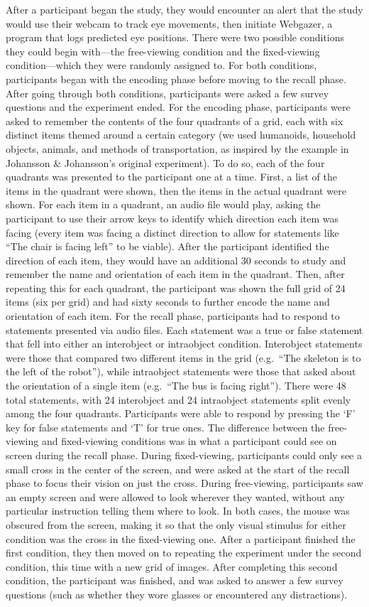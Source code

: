 \documentclass[
  english,
  man]{apa6}
\begin{document}
After a participant began the study, they would encounter an alert that the study would use their webcam to track eye movements, then initiate Webgazer, a program that logs predicted eye positions. There were two possible conditions they could begin with---the free-viewing condition and the fixed-viewing condition---which they were randomly assigned to. For both conditions, participants began with the encoding phase before moving to the recall phase. After going through both conditions, participants were asked a few survey questions and the experiment ended.
For the encoding phase, participants were asked to remember the contents of the four quadrants of a grid, each with six distinct items themed around a certain category (we used humanoids, household objects, animals, and methods of transportation, as inspired by the example in Johansson \& Johansson's original experiment). To do so, each of the four quadrants was presented to the participant one at a time. First, a list of the items in the quadrant were shown, then the items in the actual quadrant were shown. For each item in a quadrant, an audio file would play, asking the participant to use their arrow keys to identify which direction each item was facing (every item was facing a distinct direction to allow for statements like ``The chair is facing left'' to be viable). After the participant identified the direction of each item, they would have an additional 30 seconds to study and remember the name and orientation of each item in the quadrant. Then, after repeating this for each quadrant, the participant was shown the full grid of 24 items (six per grid) and had sixty seconds to further encode the name and orientation of each item.
For the recall phase, participants had to respond to statements presented via audio files. Each statement was a true or false statement that fell into either an interobject or intraobject condition. Interobject statements were those that compared two different items in the grid (e.g.~``The skeleton is to the left of the robot''), while intraobject statements were those that asked about the orientation of a single item (e.g.~``The bus is facing right''). There were 48 total statements, with 24 interobject and 24 intraobject statements split evenly among the four quadrants. Participants were able to respond by pressing the `F' key for false statements and `T' for true ones.
The difference between the free-viewing and fixed-viewing conditions was in what a participant could see on screen during the recall phase. During fixed-viewing, participants could only see a small cross in the center of the screen, and were asked at the start of the recall phase to focus their vision on just the cross. During free-viewing, participants saw an empty screen and were allowed to look wherever they wanted, without any particular instruction telling them where to look. In both cases, the mouse was obscured from the screen, making it so that the only visual stimulus for either condition was the cross in the fixed-viewing one. After a participant finished the first condition, they then moved on to repeating the experiment under the second condition, this time with a new grid of images. After completing this second condition, the participant was finished, and was asked to answer a few survey questions (such as whether they wore glasses or encountered any distractions).
\end{document}
